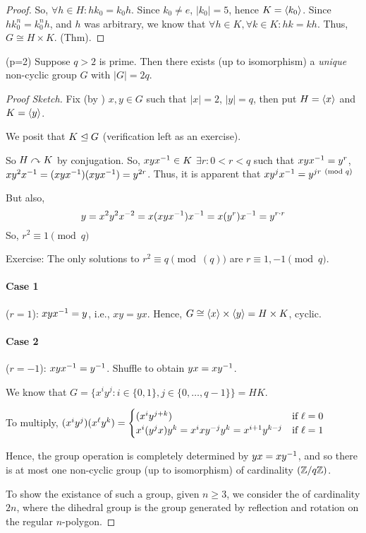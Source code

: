 \documentclass[notes.tex]{subfiles}
\begin{document}
\begin{proof}
	So, $\forall h\in H: hk_0 = k_0h$.
	Since $k_0\ne e$, $|k_0| = 5$, hence $K = \left\langle{k_0}\right\rangle$.
	Since $hk_0^n = k_0^nh$, and $h$ was arbitrary, we know that 
	$\forall h\in K, \forall k\in K: hk=kh$. Thus, $G\cong H\times K$.
	\qedhere(Thm).
\end{proof}

\begin{proposition}
	(p=2) Suppose $q > 2$ is prime. Then there exists (up to isomorphism) a \emph{unique} non-cyclic group $G$ with $|G| = 2q$.
\end{proposition}

\begin{proof}[Proof Sketch]
	Fix (by ) $x, y\in G$ such that $|x| = 2$, $|y| = q$, then put $H = \left\langle{x}\right\rangle$ and $K = \left\langle{y}\right\rangle$.

	We posit that $K\trianglelefteq G$ (verification left as an exercise).

	So $H\curvearrowright K$ by conjugation.
	So, $xy{x}^{-1}\in K$ $\exists r: 0 < r < q$ such that $xy{x}^{-1} = y^r$,
	$xy^2{x}^{-1}=(xy{x}^{-1})(xy{x}^{-1}) = y^{2r}$. Thus, it is apparent that $xy^j{x}^{-1} = y^{jr\pmod q}$

	But also, \[
		y
		=x^2y^2x^{-2}
		=x(xy{x}^{-1}){x}^{-1}
		=x(y^r){x}^{-1}
		=y^{r\cdot r}
	\]
	So, $r^2\equiv 1\pmod q$

	Exercise: The only solutions to $r^2\equiv q\pmod(q)$ are $r\equiv 1, -1\pmod q$.

	\paragraph{Case 1} ($r=1$): $xy{x}^{-1}  = y$, i.e., $xy = yx$. Hence, $G\cong \left\langle{x}\right\rangle\times \left\langle{y}\right\rangle = H\times K$, cyclic.
	\paragraph{Case 2} ($r=-1$): $xy{x}^{-1} = {y}^{-1}$. Shuffle to obtain $yx = x{y}^{-1}$.

	We know that $G = \{x^iy^j : i\in \{0, 1\}, j\in \{0, \ldots, q-1\}\} = HK$.

	To multiply, $(x^iy^j)(x^\ell y^k) = \begin{cases}
		(x^iy^{j+k}) &\text{if } \ell = 0\\
		x^i(y^jx)y^k = x^ixy^{-j}y^k = x^{i+1}y^{k-j} &\text{if } \ell = 1
	\end{cases}$

	Hence, the group operation is completely determined by $yx=x{y}^{-1}$, and so there is at most one non-cyclic group (up to isomorphism) of cardinality $(\mathbb{Z}/{q}\mathbb{Z})$.

	To show the existance of such a group, given $n \ge 3$, we consider the  of cardinality $2n$, where the dihedral group is the group generated by reflection and rotation on the regular $n$-polygon.
\end{proof}
\end{document}
